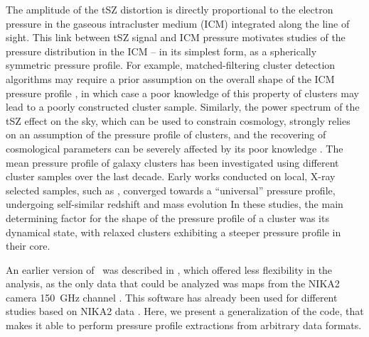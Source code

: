 The amplitude of the tSZ distortion is directly proportional to the electron pressure in the gaseous intracluster medium (ICM) integrated along the line of sight.
This link between tSZ signal and ICM pressure motivates studies of the pressure distribution in the ICM -- in its simplest form, as a spherically symmetric pressure profile.
For example, matched-filtering cluster detection algorithms may require a prior assumption on the overall shape of the ICM pressure profile \citep[\eg][]{melin_comparison_2012}, in which case a poor knowledge of this property of clusters may lead to a poorly constructed cluster sample.
Similarly, the power spectrum of the tSZ effect on the sky, which can be used to constrain cosmology, strongly relies on an assumption of the pressure profile of clusters, and the recovering of cosmological parameters can be severely affected by its poor knowledge \citep{ruppin_impact_2019}.
The mean pressure profile of galaxy clusters has been investigated using different cluster samples over the last decade.
Early works conducted on local, X-ray selected samples, such as \citet[][hereafter \aten]{arnaud_universal_2010}, converged towards a ``universal'' pressure profile, undergoing self-similar redshift and mass evolution \citep[see also \eg][]{battaglia_cluster_2012-1, planck_collaboration_planck_2013}
In these studies, the main determining factor for the shape of the pressure profile of a cluster was its dynamical state, with relaxed clusters exhibiting a steeper pressure profile in their core.

\textcolor{lightgray}{\lipsum[1]}


An earlier version of \panco\ was described in \citet{keruzore_panco2_2021}, which offered less flexibility in the analysis, as the only data that could be analyzed was maps from the NIKA2 camera 150~GHz channel \citep{adam_nika2_2018, perotto_calibration_2020}.
This software has already been used for different studies based on NIKA2 data \citep[\eg][]{artis_psz2_2022,munoz-echeverria_multi-probe_2022,munoz-echeverria_lpsz-clash_2022}.
Here, we present a generalization of the code, that makes it able to perform pressure profile extractions from arbitrary data formats.



